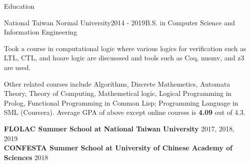 \documentclass{resume} %
\begin{document}

\begin{rSection}{Education}

\begin{rSubsection}{National Taiwan Normal University}{2014 - 2019}{B.S. in Computer Science and Information Engineering}{}
\item Took a course in computational logic where various logics for verification such as LTL, CTL, and hoare logic are discusssed and
tools such as Coq, nusmv, and z3 are used.
\item Other related courses include Algorithms, Discrete Mathemetics, Automata Theory, Theory of Computing, Mathemetical logic, Logical Programming
in Prolog, Functional Programming in Common Lisp; Programming Language in SML (Coursera).
Average GPA of above except online courses is {\bf 4.09} out of 4.3.
\end{rSubsection}

{\bf FLOLAC Summer School at National Taiwan University} \hfill {2017, 2018, 2019} \\
{\bf CONFESTA Summer School at University of Chinese Academy of Sciences} \hfill {2018}

\end{rSection}

\end{document}
